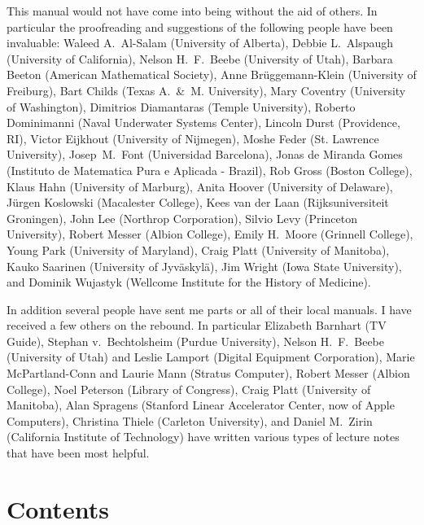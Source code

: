 This manual would not have come into being without the aid of others. 
In particular the proofreading and suggestions of the following 
people have been invaluable: 
\begingroup 
\frenchspacing 
Waleed A.~Al-Salam (University of Alberta), 
Debbie L.~Alspaugh (University of California), 
Nelson H.~F.~Beebe (University of Utah), 
Barbara Beeton (American Mathematical Society), 
Anne Br\"uggemann-Klein (University of Freiburg), 
Bart Childs (Texas A.~\&~M\null. University), 
Mary Coventry (University of Washington), 
Dimitrios Diamantaras (Temple University), 
Roberto Dominimanni (Naval Underwater Systems Center), 
Lincoln Durst (Providence, RI), 
Victor Eijkhout (University of Nijmegen), 
Moshe Feder (St. Lawrence University), 
Josep~M.~Font (Universidad Barcelona), 
Jonas de Miranda Gomes 
        (Instituto de Matematica Pura e Aplicada - Brazil), 
Rob Gross (Boston College), 
Klaus Hahn (University of Marburg), 
Anita Hoover (University of Delaware), 
J\"urgen Koslowski (Macalester College), 
Kees van der Laan (Rijksuniversiteit Groningen), 
John Lee (Northrop Corporation), 
Silvio Levy (Princeton University), 
Robert Messer (Albion College), 
Emily H.~Moore (Grinnell College), 
Young Park (University of Maryland), 
Craig Platt (University of Manitoba), 
Kauko Saarinen (University of Jyv\"askyl\"a), 
Jim Wright (Iowa State University), 
and 
Dominik Wujastyk (Wellcome Institute for the History of Medicine). 
 \endgroup 
 
In addition several people have sent me parts or all of their local 
manuals.  I have received a few others on the rebound. 
In particular 
\begingroup 
\frenchspacing 
Elizabeth Barnhart (TV Guide), 
Stephan v.~Bechtolsheim (Purdue University), 
Nelson H.~F.~Beebe (University of Utah) 
             and Leslie Lamport (Digital Equipment Corporation), 
Marie McPartland-Conn and Laurie Mann (Stratus Computer), 
Robert Messer (Albion College), 
Noel Peterson (Library of Congress), 
Craig Platt (University of Manitoba), 
Alan Spragens (Stanford Linear Accelerator Center, now of Apple Computers), 
Christina Thiele (Carleton University), 
and Daniel M.~Zirin (California Institute of Technology) 
\endgroup 
have written various types of lecture notes that have been most helpful. 
 
\vfill \eject 
\section{Contents} 
 
